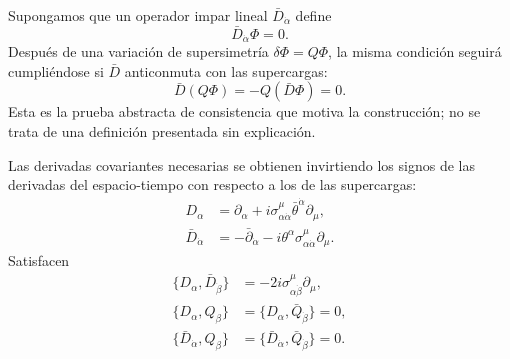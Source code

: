 Supongamos que un operador impar lineal \(\bar D_{\dot\alpha}\) define
\begin{equation}
\bar D_{\dot\alpha}\Phi=0.
\label{eq:l8-chiral-constraint}
\end{equation}
Después de una variación de supersimetría \(\delta\Phi=Q\Phi\), la misma condición seguirá cumpliéndose si \(\bar D\) anticonmuta con las supercargas:
\begin{equation}
\bar D(Q\Phi)=-Q(\bar D\Phi)=0.
\end{equation}
Esta es la prueba abstracta de consistencia que motiva la construcción; no se trata de una definición presentada sin explicación.

\begin{classroomqa}
\end{classroomqa}

Las derivadas covariantes necesarias se obtienen invirtiendo los signos de las derivadas del espacio-tiempo con respecto a los de las supercargas:
\begin{align}
D_\alpha
&=\partial_\alpha
+i\sigma^\mu_{\alpha\dot\alpha}
\bar\theta^{\dot\alpha}\partial_\mu,
\label{eq:l8-D}\\
\bar D_{\dot\alpha}
&=-\bar\partial_{\dot\alpha}
-i\theta^\alpha\sigma^\mu_{\alpha\dot\alpha}\partial_\mu.
\label{eq:l8-Dbar}
\end{align}
Satisfacen
\begin{align}
\{D_\alpha,\bar D_{\dot\beta}\}
&=-2i\sigma^\mu_{\alpha\dot\beta}\partial_\mu,\\
\{D_\alpha,Q_\beta\}
&=\{D_\alpha,\bar Q_{\dot\beta}\}=0,\\
\{\bar D_{\dot\alpha},Q_\beta\}
&=\{\bar D_{\dot\alpha},\bar Q_{\dot\beta}\}=0.
\end{align}

\begin{classroomqa}
\end{classroomqa}

